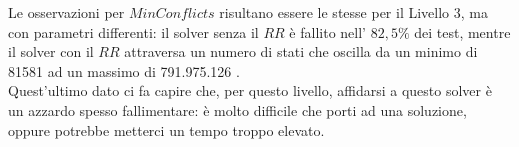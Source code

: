 Le osservazioni per $MinConflicts$ risultano essere le stesse per il Livello 3, ma con parametri differenti: il solver senza il $RR$ è fallito nell' $82,5\%$ dei test, mentre il solver con il $RR$ attraversa un numero di stati che oscilla da un minimo di 81581 ad un massimo di 791.975.126 .\\
Quest'ultimo dato ci fa capire che, per questo livello, affidarsi a questo solver è un azzardo spesso fallimentare: è molto difficile che porti ad una soluzione, oppure potrebbe metterci un tempo troppo elevato. 





